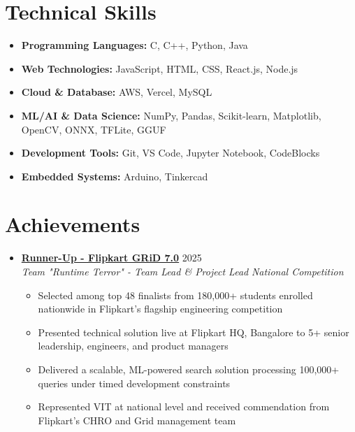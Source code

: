 \documentclass[a4paper,10pt]{article}
\newcommand{\resumeItem}[1]{\item\small{#1}\vspace{2pt}}
\newcommand{\resumeSubheading}[4]{
  \item 
    \textbf{#1} \hfill #2 \\
    \textit{#3} \hfill \textit{#4}\vspace{3pt}
}
\newcommand{\resumeSubHeadingListStart}{\begin{itemize}[leftmargin=0.15in, label={}]}
\newcommand{\resumeSubHeadingListEnd}{\end{itemize}\vspace{1pt}}
\newcommand{\resumeItemListStart}{\begin{itemize}[leftmargin=*]}
\newcommand{\resumeItemListEnd}{\end{itemize}\vspace{-2pt}}
\begin{document}
\section{Technical Skills}  
  \resumeSubHeadingListStart
    \item \textbf{Programming Languages:} C, C++, Python, Java
    \item \textbf{Web Technologies:} JavaScript, HTML, CSS, React.js, Node.js
    \item \textbf{Cloud \& Database:} AWS, Vercel, MySQL
    \item \textbf{ML/AI \& Data Science:} NumPy, Pandas, Scikit-learn, Matplotlib, OpenCV, ONNX, TFLite, GGUF
    \item \textbf{Development Tools:} Git, VS Code, Jupyter Notebook, CodeBlocks
    \item \textbf{Embedded Systems:} Arduino, Tinkercad
  \resumeSubHeadingListEnd

\newpage

\section{Achievements}
  \resumeSubHeadingListStart
    \resumeSubheading
      {\href{https://drive.google.com/file/d/1FJbwrq1z7MZYFMQjBcS_dEUwd2aVLhW8/view?usp=sharing}{Runner-Up - Flipkart GRiD 7.0} \small\faExternalLink}{2025}
      {Team "Runtime Terror" - Team Lead \& Project Lead}{National Competition}
      \resumeItemListStart
        \resumeItem{Selected among top 48 finalists from 180,000+ students enrolled nationwide in Flipkart's flagship engineering competition}
        \resumeItem{Presented technical solution live at Flipkart HQ, Bangalore to 5+ senior leadership, engineers, and product managers}
        \resumeItem{Delivered a scalable, ML-powered search solution processing 100,000+ queries under timed development constraints}
        \resumeItem{Represented VIT at national level and received commendation from Flipkart's CHRO and Grid management team}
      \resumeItemListEnd
  \resumeSubHeadingListEnd
\end{document}
